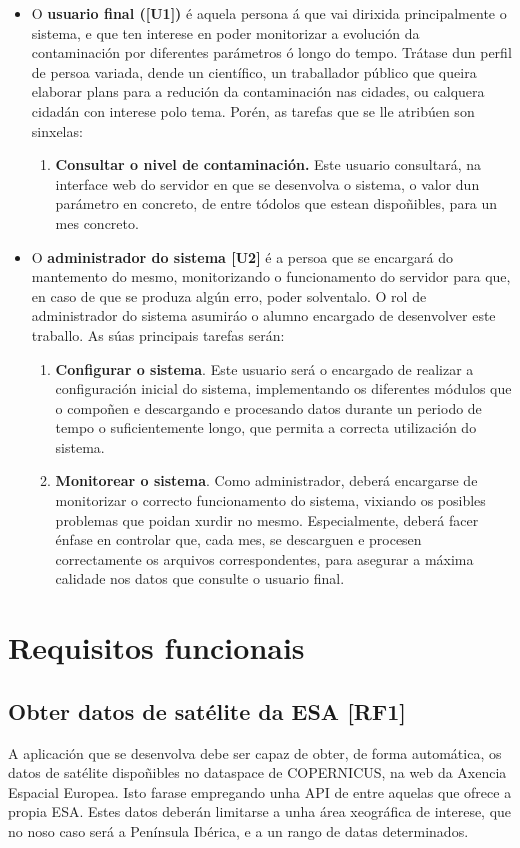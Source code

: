 \begin{itemize}
    \item O \textbf{usuario final ([U1])} é aquela persona á que vai dirixida principalmente o sistema, e que ten interese en poder monitorizar a evolución da contaminación por
    diferentes parámetros ó longo do tempo. Trátase dun perfil de persoa variada, dende un científico, un traballador público que queira elaborar plans para a redución da contaminación
    nas cidades, ou calquera cidadán con interese polo tema. Porén, as tarefas que se lle atribúen son sinxelas:
    \begin{enumerate}
        \item \textbf{Consultar o nivel de contaminación.} Este usuario consultará, na interface web do servidor en que se desenvolva o sistema, o valor dun parámetro en concreto, de entre
        tódolos que estean dispoñibles, para un mes concreto.
    \end{enumerate}
    \item O \textbf{administrador do sistema [U2]} é a persoa que se encargará do mantemento do mesmo, monitorizando o funcionamento do servidor para que, en caso de que se produza algún
    erro, poder solventalo. O rol de administrador do sistema asumiráo o alumno encargado de desenvolver este traballo. As súas principais tarefas serán:
    \begin{enumerate}
        \item \textbf{Configurar o sistema}. Este usuario será o encargado de realizar a configuración inicial do sistema, implementando os diferentes módulos que o compoñen
        e descargando e procesando datos durante un periodo de tempo o suficientemente longo, que permita a correcta utilización do sistema.
        \item \textbf{Monitorear o sistema}. Como administrador, deberá encargarse de monitorizar o correcto funcionamento do sistema, vixiando os posibles problemas que poidan xurdir no
        mesmo. Especialmente, deberá facer énfase en controlar que, cada mes, se descarguen e procesen correctamente os arquivos correspondentes, para asegurar a máxima calidade nos datos
        que consulte o usuario final.
    \end{enumerate}
\end{itemize}


\section{Requisitos funcionais}
\subsection{Obter datos de satélite da ESA [RF1]}\label{rf1}
A aplicación que se desenvolva debe ser capaz de obter, de forma automática, os datos de satélite dispoñibles no dataspace de COPERNICUS,
na web da Axencia Espacial Europea. Isto farase empregando unha API de entre aquelas que ofrece a propia ESA. Estes datos deberán limitarse
a unha área xeográfica de interese, que no noso caso será a Península Ibérica, e a un rango de datas determinados.

